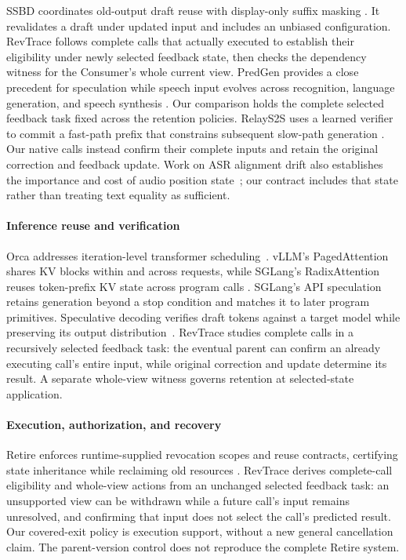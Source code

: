 SSBD coordinates old-output draft reuse with display-only suffix masking
\cite{zeng2026ssbd}. It revalidates a draft under updated input and includes
an unbiased configuration. RevTrace follows complete calls that actually
executed to establish their eligibility under newly selected feedback state,
then checks the dependency witness for the Consumer's whole current view.
PredGen provides a close precedent for speculation while speech input
evolves across recognition, language generation, and speech synthesis
\cite{li2025predgen}. Our comparison holds the complete selected feedback
task fixed across the retention policies. RelayS2S uses a learned verifier to commit a fast-path
prefix that constrains subsequent slow-path generation
\cite{mai2026relays2s}. Our native calls instead confirm their complete
inputs and retain the original correction and feedback update. Work on
ASR alignment drift also establishes the importance and cost of audio
position state~\cite{wang2026alignmentdrift}; our contract includes that
state rather than treating text equality as sufficient.

\paragraph{Inference reuse and verification}
Orca addresses iteration-level transformer scheduling~\cite{yu2022orca}.
vLLM's PagedAttention shares KV blocks within and across requests, while
SGLang's RadixAttention reuses token-prefix KV state across program calls
\cite{kwon2023pagedattention,zheng2024sglang}. SGLang's API speculation
retains generation beyond a stop condition and matches it to later
program primitives.
Speculative decoding verifies draft tokens against a target model while
preserving its output distribution~\cite{leviathan2023speculative}.
RevTrace studies complete calls in a recursively selected feedback task:
the eventual parent can confirm an already executing call's entire input,
while original correction and update determine its result. A separate
whole-view witness governs retention at selected-state application.

\paragraph{Execution, authorization, and recovery}
Retire enforces runtime-supplied revocation scopes and reuse contracts,
certifying state inheritance while reclaiming old resources
\cite{zhang2026retire}.
RevTrace derives complete-call eligibility and whole-view actions from
an unchanged selected feedback task: an unsupported view can be withdrawn
while a future call's input remains unresolved, and confirming that input
does not select the call's predicted result. Our covered-exit policy
is execution support, without a new general cancellation claim. The
parent-version control does not reproduce the complete Retire system.

